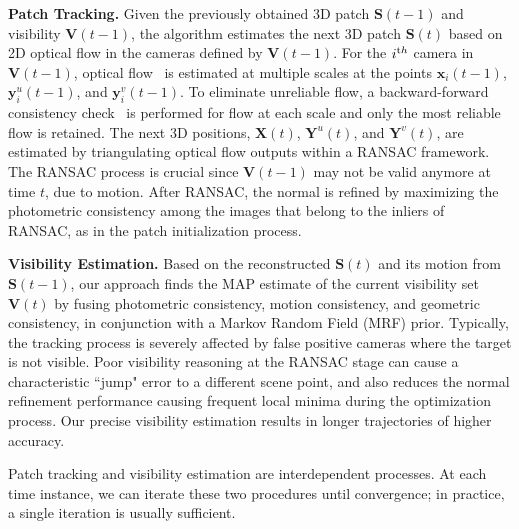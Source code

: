 \noindent \textbf{Patch Tracking.} Given the previously obtained 3D patch $\mathbf{S}(t-1)$ and visibility $\mathbf{V}(t-1)$, the algorithm estimates the next 3D patch $\mathbf{S}(t)$ based on 2D optical flow in the cameras defined by $\mathbf{V}(t-1)$. For the $i^{\textrm th}$ camera in $\mathbf{V}(t-1)$, optical flow~\cite{Lucas1981} is estimated at multiple scales at the points $\mathbf{x}_i(t-1)$, $\mathbf{y}^u_i(t-1)$, and $\mathbf{y}^v_i(t-1)$. To eliminate unreliable flow, a backward-forward consistency check~\cite{sundaram2010dense} is performed for flow at each scale and only the most reliable flow is retained. The next 3D positions, $\mathbf{X}(t)$, $\mathbf{Y}^{u}(t)$, and $\mathbf{Y}^{v}(t)$, are estimated by triangulating optical flow outputs within a RANSAC framework. The RANSAC process is crucial since $\mathbf{V}(t-1)$ may not be valid anymore at time $t$, due to motion. After RANSAC, the normal is refined by maximizing the photometric consistency among the images that belong to the inliers of RANSAC, as in the patch initialization process.


\noindent \textbf{Visibility Estimation.} Based on the reconstructed $\mathbf{S}(t)$ and its motion from $\mathbf{S}(t-1)$, our approach finds the MAP estimate of the current visibility set $\mathbf{V}(t)$ by fusing photometric consistency, motion consistency, and geometric consistency, in conjunction with a Markov Random Field (MRF) prior. Typically, the tracking process is severely affected by false positive cameras where the target is not visible. Poor visibility reasoning at the RANSAC stage can cause a characteristic ``jump" error to a different scene point, and also reduces the normal refinement performance causing frequent local minima during the optimization process. Our precise visibility estimation results in longer trajectories of higher accuracy.

Patch tracking and visibility estimation are interdependent processes. At each time instance, we can iterate these two procedures until convergence; in practice, a single iteration is usually sufficient.  

